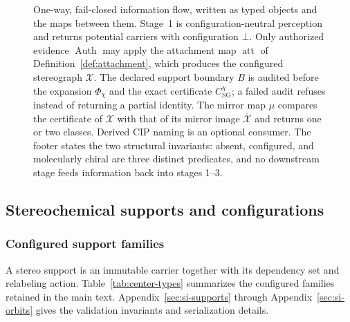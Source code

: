 \documentclass[pdflatex,sn-mathphys-num,referee,lineno]{sn-jnl}
\theoremstyle{plain}
\theoremstyle{remark}
\theoremstyle{definition}
\begin{document}
\begin{figure}[htbp]
  \centering
  \resizebox{\textwidth}{!}{}
  \caption{One-way, fail-closed information flow, written as typed objects and
  the maps between them.  Stage~1 is configuration-neutral perception and
  returns potential carriers with configuration \(\bot\).  Only authorized
  evidence \(\operatorname{Auth}\) may apply the attachment map
  \(\operatorname{att}\) of Definition~\ref{def:attachment}, which produces the
  configured stereograph \(\mathcal X\).  The declared support boundary \(B\)
  is audited before the expansion \(\Phi_\chi\) and the exact certificate
  \(C^\chi_{\mathrm{SG}}\); a failed audit refuses instead of returning a
  partial identity.  The mirror map \(\mu\) compares the certificate of
  \(\mathcal X\) with that of its mirror image \(\overline{\mathcal X}\) and
  returns one or two classes.  Derived CIP naming is an optional consumer.  The
  footer states the two structural invariants: absent, configured, and
  molecularly chiral are three distinct predicates, and no downstream stage
  feeds information back into stages 1--3.}
  \label{fig:pipeline}
\end{figure}

\subsection{Stereochemical supports and configurations}
\label{sec:center-types}

\subsubsection{Configured support families}

A stereo support is an immutable carrier together with its dependency set and
relabeling action.  Table~\ref{tab:center-types} summarizes the configured
families retained in the main text.  Appendix~\ref{sec:si-supports} through
Appendix~\ref{sec:si-orbits} gives the validation invariants and serialization
details.
\end{document}
